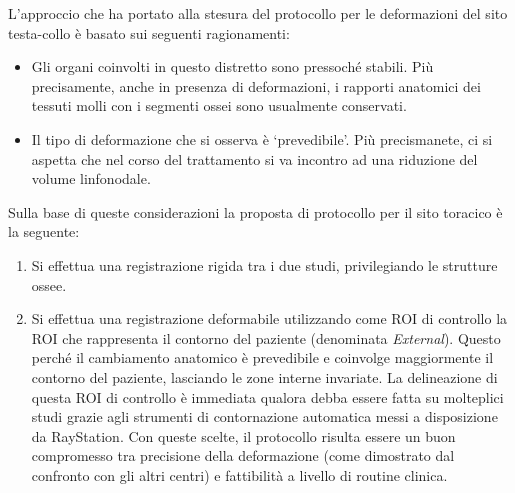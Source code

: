 L'approccio che ha portato alla stesura del protocollo per le deformazioni del sito testa-collo è basato sui seguenti ragionamenti:
\begin{itemize}
\item Gli organi coinvolti in questo distretto sono pressoché stabili. Più precisamente, anche in presenza di deformazioni, i rapporti anatomici dei tessuti molli con i segmenti ossei sono usualmente conservati.
\item Il tipo di deformazione che si osserva è `prevedibile'. Più precismanete, ci si aspetta che nel corso del trattamento si va incontro ad una riduzione del volume linfonodale.
\end{itemize}
Sulla base di queste considerazioni la proposta di protocollo per il sito toracico è la seguente:
\begin{enumerate}
\item Si effettua una registrazione rigida tra i due studi, privilegiando le strutture ossee.
\item Si effettua una registrazione deformabile utilizzando come ROI di controllo la ROI che rappresenta il contorno del paziente (denominata \textit{External}). Questo perché il cambiamento anatomico è prevedibile e coinvolge maggiormente il contorno del paziente, lasciando le zone interne invariate. La delineazione di questa ROI di controllo è immediata qualora debba essere fatta su molteplici studi grazie agli strumenti di contornazione automatica messi a disposizione da RayStation. Con queste scelte, il protocollo risulta essere un buon compromesso tra precisione della deformazione (come dimostrato dal confronto con gli altri centri) e fattibilità a livello di routine clinica.
\end{enumerate}


